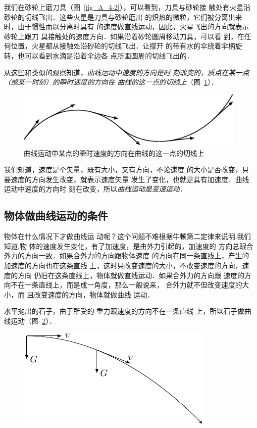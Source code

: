     我们在砂轮上磨刀具（图~\ref{fig_A_4-2}），可以看到，刀具与砂轮接
触处有火星沿砂轮的切线飞出．这些火星是刀具与砂轮磨出
的炽热的微粒，它们被分离出来时，由于惯性而以分离时具有
的速度做直线运动，因此，火星飞出的方向就表示砂轮上跟刀
具接触处的速度方向．如果沿着砂轮圆周移动刀具，可以看
到，在任何位置，火星都从接触处沿砂轮的切线飞出．让撑开
的带有水的伞绕着伞柄旋转，也可以看到水滴是沿着伞边各
点所画圆周的切线飞出的．

从这些和类似的观察知道，\textit{曲线运动中速度的方向是时
刻改变的，质点在某一点（或某一时刻）的瞬时速度的方向在
曲线的这一点的切线上}（图~\ref{fig_A_4-3}）．

\begin{figure}[htbp]
    \centering
    \includegraphics{fig/A/4-3.pdf}
    \caption{曲线运动中某点的瞬时速度的方向在曲线的这一点的切线上}\label{fig_A_4-3}
\end{figure}

我们知道，速度是个矢量，既有大小，又有方向，不论速度
的大小是否改变，只要速度的方向发生改变，就表示速度矢量
发生了变化，也就是具有加速度．曲线运动中速度的方向时
刻在改变，所以\textit{曲线运动是变速运动}．

\subsection{物体做曲线运动的条件}

物体在什么情况下才做曲线运
动呢？这个问题不难根据牛顿第二定律来说明.我们知道,物
体的速度发生变化，有了加速度，是由外力引起的，加速度的
方向总跟合外力的方向一致．如果合外力的方向跟物体速度
的方向在同一条直线上，产生的加速度的方向也在这条直线
上，这时只改变速度的大小，不改变速度的方向，速度的方向
仍旧在这条直线上，物体就做直线运动．如果合外力的方向跟
速度的方向不在一条直线上，而是成一角度，那么一般说来，
合外力就不但改变速度的大小，而
且改变速度的方向，物体就做曲线
运动．

    水平抛出的石子，由于所受的
重力跟速度的方向不在一条直线
上，所以石子做曲线运动（图~\ref{fig_A_4-4}）．

\begin{figure}[htbp]
    \centering
    \includegraphics{fig/A/4-4.pdf}
    \caption{}\label{fig_A_4-4}
\end{figure}
 
